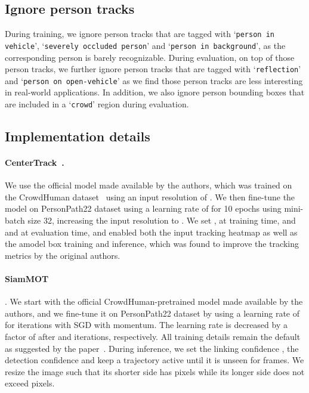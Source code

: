 \documentclass[runningheads]{llncs}
\begin{document}
\subsection{Ignore person tracks}
During training, we ignore person tracks that are tagged with `\texttt{person in vehicle}', `\texttt{severely occluded person}' and `\texttt{person in background}', as the corresponding person is barely recognizable. During evaluation, on top of those person tracks, we further ignore person tracks that are tagged with `\texttt{reflection}' and `\texttt{person on open-vehicle}' as we find those person tracks are less interesting in real-world applications. In addition, we also ignore person bounding boxes that are included in a `\texttt{crowd}' region during evaluation.   

\subsection{Implementation details}

\paragraph{CenterTrack~\cite{centertrack}.} We use the official model made available by the authors, which was trained on the CrowdHuman dataset~\cite{shao2018crowdhuman} using an input resolution of . We then fine-tune the model on PersonPath22 dataset using a learning rate of  for 10 epochs using mini-batch size 32, increasing the input resolution to . We set ,  at training time, and  and  at evaluation time, and enabled both the input tracking heatmap as well as the amodel box training and inference, which was found to improve the tracking metrics by the original authors.

\paragraph{SiamMOT~\cite{siammot}}. We start with the official CrowdHuman-pretrained model made available by the authors, and we fine-tune it on PersonPath22 dataset by using a learning rate of  for  iterations with SGD with momentum. The learning rate is decreased by a factor of  after  and  iterations, respectively. All training details remain the default as suggested by the paper~\cite{siammot}. During inference, we set the linking confidence , the detection confidence  and keep a trajectory active until it is unseen for  frames. We resize the image such that its shorter side has  pixels while its longer side does not exceed  pixels.
\end{document}
